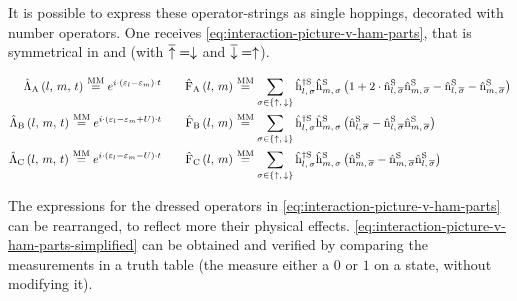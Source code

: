 It is possible to express these operator-strings as single hoppings, decorated with number operators. One receives \autoref{eq:interaction-picture-v-ham-parts}, that is symmetrical in \up and \down (with $\overline{\uparrow} = \downarrow$ and  $\overline{\downarrow} = \uparrow$).

\begin{equation}
    \label{eq:interaction-picture-v-ham-parts}
    \begin{split}
        \VhamiltonianAnalyticalPart{A}{l}{m}{t} \stackrel{\text{MM}}{=} e^{i\cdot \left(\epsl-\epsl[m]\right)\cdot t} \qquad
        \VhamiltonianOperatorPart{A}{l}{m} &\stackrel{\text{MM}}{=} 
        \lsum[\sigma \in \left\{\up,\,\down\right\}]
        \withspinhcop[\schroedingerPicture]{l}{\sigma}{\dagger}\withspinhcop[\schroedingerPicture]{m}{\sigma}{}
        \left(
            1+
            2 \cdot \nop[\schroedingerPicture]{l}{\overline{\sigma}}\nop[\schroedingerPicture]{m}{\overline{\sigma}}
            - \nop[\schroedingerPicture]{l}{\overline{\sigma}}
            - \nop[\schroedingerPicture]{m}{\overline{\sigma}}
        \right)
        \\
        \VhamiltonianAnalyticalPart{B}{l}{m}{t} \stackrel{\text{MM}}{=} e^{i\cdot \left(\epsl-\epsl[m] + U\right)\cdot t} \qquad
        \VhamiltonianOperatorPart{B}{l}{m} &\stackrel{\text{MM}}{=} 
        \lsum[\sigma \in \left\{\up,\,\down\right\}]        
        \withspinhcop[\schroedingerPicture]{l}{\sigma}{\dagger}\withspinhcop[\schroedingerPicture]{m}{\sigma}{}
        \left(
            \nop[\schroedingerPicture]{l}{\overline{\sigma}}
            - \nop[\schroedingerPicture]{l}{\overline{\sigma}}\nop[\schroedingerPicture]{m}{\overline{\sigma}}
        \right)
        \\
        \VhamiltonianAnalyticalPart{C}{l}{m}{t} \stackrel{\text{MM}}{=} e^{i\cdot \left(\epsl-\epsl[m] - U\right)\cdot t} \qquad
        \VhamiltonianOperatorPart{C}{l}{m} &\stackrel{\text{MM}}{=} 
        \lsum[\sigma \in \left\{\up,\,\down\right\}]
        \withspinhcop[\schroedingerPicture]{l}{\sigma}{\dagger}\withspinhcop[\schroedingerPicture]{m}{\sigma}{}
        \left(
            \nop[\schroedingerPicture]{m}{\overline{\sigma}}
            - \nop[\schroedingerPicture]{m}{\overline{\sigma}}\nop[\schroedingerPicture]{l}{\overline{\sigma}}
        \right)
        \\
    \end{split}
\end{equation}

The expressions for the dressed operators in \autoref{eq:interaction-picture-v-ham-parts} can be rearranged, to reflect more their physical effects.
\autoref{eq:interaction-picture-v-ham-parts-simplified} can be obtained and verified by comparing the measurements in a truth table (the \nop[\schroedingerPicture]{}{} measure either a $0$ or $1$ on a state, without modifying it).

